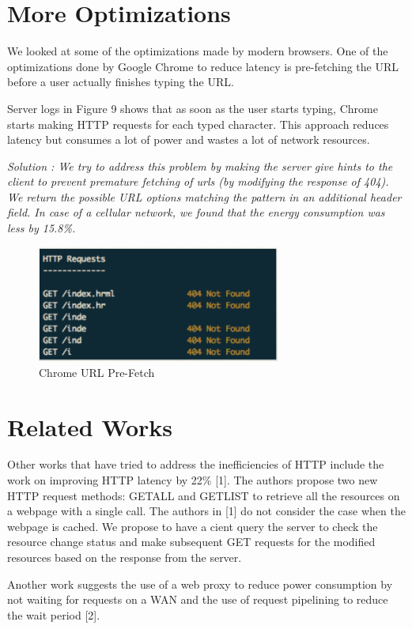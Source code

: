 \documentclass{sigplanconf}
\begin{document}
\section{More Optimizations}

We looked at some of the optimizations made by modern browsers. One of the optimizations done by Google Chrome to reduce latency is pre-fetching the URL before a user actually finishes typing the URL.
 
Server logs in Figure 9 shows that as soon as the user starts typing, Chrome starts making HTTP requests for each typed character. This approach reduces latency but consumes a lot of power and wastes a lot of network resources. 

\it{Solution} \rm: We try to address this problem by making the server give hints to the client to prevent premature fetching of urls (by modifying the response of 404). We return the possible URL options matching the pattern in an additional header field. In case of a cellular network, we found that the energy consumption was less by 15.8\%.

\begin{figure}[ht!]
\centering
\includegraphics[width=80mm]{chrome}
\caption{Chrome URL Pre-Fetch}
\label{fig:sp_gd_mnist}
\end{figure}

\section{ Related Works}

Other works that have tried to address the inefficiencies of HTTP include the work on improving HTTP latency by 22\% [1]. The authors propose two new HTTP request methods: GETALL and GETLIST to retrieve all the resources on a webpage with a single call. The authors in [1] do not consider the case when the webpage is cached. We propose to have a cient query the server to check the resource change status and make subsequent GET requests for the modified resources based on the response from the server.

Another work suggests the use of a web proxy to reduce power consumption by not waiting for requests on a WAN and the use of request pipelining to reduce the wait period [2].
\end{document}
